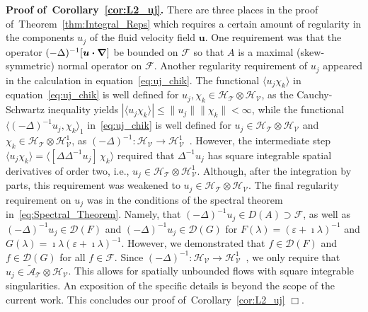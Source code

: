 \documentclass[leqno,onefignum,onetabnum]{siamltex1213}
\newcommand{\thmref}[1]{Theorem~\ref{#1}}
\newcommand{\corref}[1]{Corollary~\ref{#1}}
\newcommand{\Tc}{\mathcal{T}}
\newcommand{\Vc}{\mathcal{V}}
\newcommand{\Hs}{\mathscr{H}}
\newcommand{\As}{\mathscr{A}}
\newcommand{\Ds}{\mathscr{D}}
\newcommand{\Fs}{\mathscr{F}}
\newcommand\bnabla{\mbox{\boldmath${\nabla}$}}
\providecommand\bcdot{\boldsymbol{\cdot}}
\newcommand{\vecu}{\boldsymbol{u}}
\begin{document}
\textbf{Proof of~\corref{cor:L2_uj}.}\hspace{1ex}
%
There are three places in the proof of~\thmref{thm:Integral_Reps}
which requires a certain amount of regularity in the components $u_j$
of the fluid velocity field $\vecu$. One requirement was that the
operator 
$(-\Delta)^{-1}[\vecu\bcdot\bnabla]$ be bounded on $\Fs$ so that $A$ is a
maximal (skew-symmetric) normal operator on $\Fs$. Another regularity
requirement of $u_j$ appeared in the calculation in
equation~\eqref{eq:uj_chik}. The functional 
$\langle u_j\chi_k\rangle$ in equation~\eqref{eq:uj_chik} is well defined for
$u_j,\chi_k\in\Hs_{\Tc}\otimes\Hs_{\Vc}$, as the Cauchy-Schwartz inequality yields
$|\langle u_j\chi_k\rangle|\leq\|u_j\|\|\chi_k\|<\infty$, while the functional
$\langle(-\Delta)^{-1}u_j,\chi_k\rangle_1$ in~\eqref{eq:uj_chik} is well defined for
$u_j\in\Hs_{\Tc}\otimes\Hs_{\Vc}$ and $\chi_k\in\Hs_{\Tc}\otimes\Hs^1_{\Vc}$, as
$(-\Delta)^{-1}:\Hs_{\Vc}\to\Hs^1_{\Vc}$~\cite{Bhattacharya:AAP:1999:951}. However,
the intermediate step 
$\langle u_j\chi_k\rangle=\langle[\Delta\Delta^{-1}u_j]\,\chi_k\rangle$ required that $\Delta^{-1}u_j$ has square
integrable spatial derivatives of order two, i.e.,
$u_j\in\Hs_{\Tc}\otimes\Hs^1_{\Vc}$. Although, after the integration by parts,
this requirement was weakened to $u_j\in\Hs_{\Tc}\otimes\Hs_{\Vc}$. The final
regularity requirement on $u_j$ was in the conditions of the spectral
theorem in~\eqref{eq:Spectral_Theorem}. Namely, that
$(-\Delta)^{-1}u_j\in D(A)\supset\Fs$, as well as $(-\Delta)^{-1}u_j\in\Ds(F)$
and $(-\Delta)^{-1}u_j\in\Ds(G)$ for $F(\lambda)=(\varepsilon+\imath\lambda)^{-1}$ and
$G(\lambda)=\imath\lambda(\varepsilon+\imath\lambda)^{-1}$. However, we demonstrated that $f\in\Ds(F)$ and 
$f\in\Ds(G)$ for all $f\in\Fs$. Since
$(-\Delta)^{-1}:\Hs_{\Vc}\to\Hs^1_{\Vc}$~\cite{Bhattacharya:AAP:1999:951}, 
we only require that $u_j\in\tilde{\As}_{\Tc}\otimes\Hs_{\Vc}$.  This allows for
spatially unbounded flows with square integrable singularities. An
exposition of the specific details is beyond the scope of the current
work. This concludes our proof of~\corref{cor:L2_uj} $\Box$.
\end{document}
